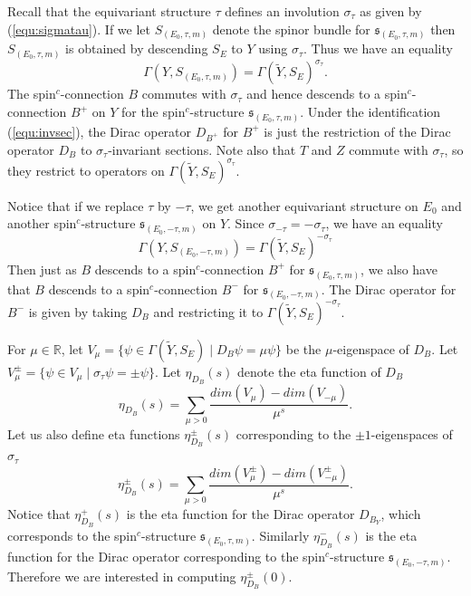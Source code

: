 \documentclass{amsart}
\theoremstyle{definition}
\theoremstyle{remark}
\numberwithin{equation}{section}
\begin{document}
Recall that the equivariant structure $\tau$ defines an involution $\sigma_\tau$ as given by (\ref{equ:sigmatau}). If we let $S_{(E_0 , \tau , m)}$ denote the spinor bundle for $\mathfrak{s}_{(E_0 , \tau , m)}$ then $S_{(E_0 , \tau , m)}$ is obtained by descending $S_E$ to $Y$ using $\sigma_\tau$. Thus we have an equality
\begin{equation}\label{equ:invsec}
\Gamma( Y ,  S_{(E_0 , \tau , m)} ) = \Gamma(\widetilde{Y} , S_E)^{\sigma_\tau}.
\end{equation}
The spin$^c$-connection $B$ commutes with $\sigma_\tau$ and hence descends to a spin$^c$-connection $B^+$ on $Y$ for the spin$^c$-structure $\mathfrak{s}_{(E_0 , \tau , m)}$. Under the identification (\ref{equ:invsec}), the Dirac operator $D_{B^+}$ for $B^+$ is just the restriction of the Dirac operator $D_B$ to $\sigma_\tau$-invariant sections. Note also that $T$ and $Z$ commute with $\sigma_\tau$, so they restrict to operators on $\Gamma(\widetilde{Y} , S_E)^{\sigma_\tau}$.

Notice that if we replace $\tau$ by $-\tau$, we get another equivariant structure on $E_0$ and another spin$^c$-structure $\mathfrak{s}_{(E_0 , -\tau , m)}$ on $Y$. Since $\sigma_{-\tau} = -\sigma_\tau$, we have an equality
\[
\Gamma( Y ,  S_{(E_0 , -\tau , m)} ) = \Gamma(\widetilde{Y} , S_E)^{-\sigma_\tau}
\]
Then just as $B$ descends to a spin$^c$-connection $B^+$ for $\mathfrak{s}_{(E_0 , \tau , m)}$, we also have that $B$ descends to a spin$^c$-connection $B^-$ for $\mathfrak{s}_{(E_0 , -\tau , m)}$. The Dirac operator for $B^-$ is given by taking $D_B$ and restricting it to $\Gamma(\widetilde{Y} , S_E)^{-\sigma_\tau}$.

For $\mu \in \mathbb{R}$, let $V_\mu = \{ \psi \in \Gamma(\widetilde{Y} , S_E) \; | \; D_B \psi = \mu \psi \}$ be the $\mu$-eigenspace of $D_B$. Let $V_\mu^{\pm} = \{ \psi \in V_\mu \; | \; \sigma_\tau \psi = \pm \psi\}$. Let $\eta_{D_B}(s)$ denote the eta function of $D_B$
\[
\eta_{D_B}(s) = \sum_{\mu > 0} \frac{ dim(V_\mu) - dim(V_{-\mu}) }{\mu^s}.
\]
Let us also define eta functions $\eta_{D_B}^{\pm}(s)$ corresponding to the $\pm 1$-eigenspaces of $\sigma_\tau$
\[
\eta_{D_B}^\pm(s) = \sum_{\mu > 0} \frac{ dim( V^\pm_{\mu}) - dim( V^\pm_{-\mu}) }{ \mu^s }.
\]
Notice that $\eta_{D_B}^+(s)$ is the eta function for the Dirac operator $D_{B_Y}$, which corresponds to the spin$^c$-structure $\mathfrak{s}_{(E_0 , \tau , m)}$. Similarly $\eta_{D_B}^-(s)$ is the eta function for the Dirac operator corresponding to the spin$^c$-structure $\mathfrak{s}_{(E_0 , -\tau , m)}$. Therefore we are interested in computing $\eta_{D_B}^\pm(0)$.
\end{document}

